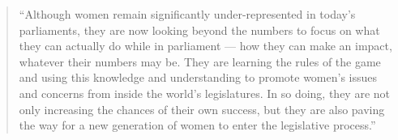 \documentclass[12pt, 
    twoside=false, 
    bibliography=totoc, 
    numbers=endperiod, 
    headings=normal, 
    toc=chapterentrydotfill
    ]{scrbook}
\begin{document}



\begin{quote}
    \enquote{Although women remain significantly under-represented in today’s parliaments, they are now looking beyond the numbers to focus on what they can actually do while in parliament — how they can make an impact, whatever their numbers may be. They are learning the rules of the game and using this knowledge and understanding to promote women’s issues and concerns from inside the world’s legislatures. In so doing, they are not only increasing the chances of their own success, but they are also paving the way for a new generation of women to enter the legislative process.} \parencite[3]{lovenduski_2015}
\end{quote}
\end{document}
